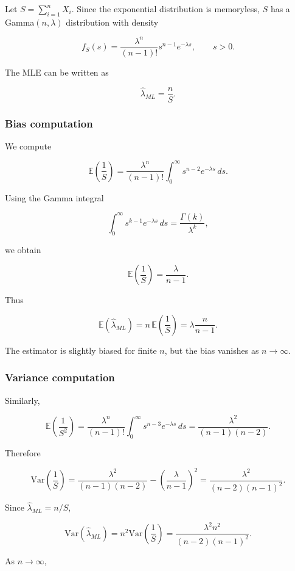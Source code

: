 Let \(S = \sum_{i=1}^n X_i\). Since the exponential distribution is memoryless, \(S\) has a Gamma\((n,\lambda)\) distribution with density

\[
f_S(s) = \frac{\lambda^n}{(n-1)!} s^{n-1} e^{-\lambda s}, \qquad s > 0.
\]

The MLE can be written as

\[
\hat{\lambda}_{ML} = \frac{n}{S}.
\]

\subsubsection*{Bias computation}

We compute

\[
\mathbb{E}\!\left( \frac{1}{S} \right)
= \frac{\lambda^n}{(n-1)!}
\int_0^\infty s^{n-2} e^{-\lambda s}\,ds.
\]

Using the Gamma integral

\[
\int_0^\infty s^{k-1} e^{-\lambda s}\,ds = \frac{\Gamma(k)}{\lambda^{k}},
\]

we obtain

\[
\mathbb{E}\!\left( \frac{1}{S} \right)
= \frac{\lambda}{n-1}.
\]

Thus

\[
\mathbb{E}(\hat{\lambda}_{ML})
= n \, \mathbb{E}\!\left( \frac{1}{S} \right)
= \lambda \frac{n}{n-1}.
\]

The estimator is slightly biased for finite \(n\), but the bias vanishes as \(n\to\infty\).

\subsubsection*{Variance computation}

Similarly,

\[
\mathbb{E}\!\left( \frac{1}{S^2} \right)
= \frac{\lambda^n}{(n-1)!}
\int_0^\infty s^{n-3} e^{-\lambda s}\,ds
= \frac{\lambda^{2}}{(n-1)(n-2)}.
\]

Therefore

\[
\mathrm{Var}\!\left( \frac{1}{S} \right)
= \frac{\lambda^{2}}{(n-1)(n-2)}
- \left( \frac{\lambda}{n-1} \right)^{2}
= \frac{\lambda^{2}}{(n-2)(n-1)^2}.
\]

Since \(\hat{\lambda}_{ML}=n/S\),

\[
\mathrm{Var}(\hat{\lambda}_{ML})
= n^{2}\mathrm{Var}\!\left( \frac{1}{S} \right)
= \frac{\lambda^{2} n^{2}}{(n-2)(n-1)^{2}}.
\]

As \(n \to \infty\),

